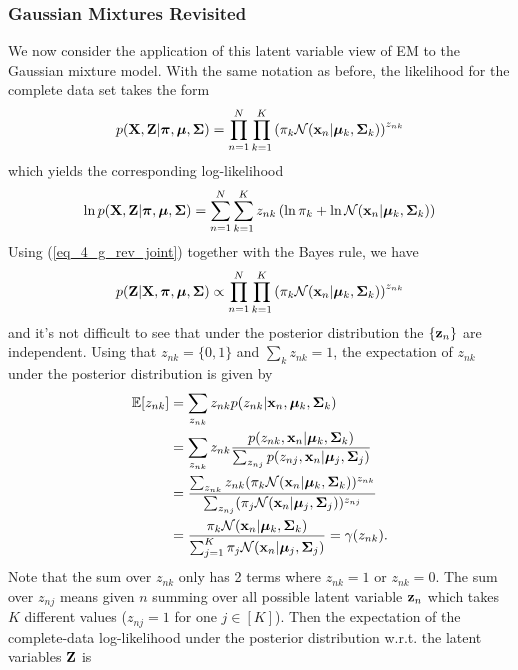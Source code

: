 \documentclass[../main.tex]{subfiles}
\begin{document}
\subsubsection{Gaussian Mixtures Revisited}
We now consider the application of this latent variable view of EM to the Gaussian mixture model. With the same notation as before, the likelihood for the complete data set takes the form
\begin{equation}\label{eq_4_g_rev_joint}
p({\bf X,Z}|\bm{\pi},\bm{\mu},{\bf \Sigma}) = \prod_{n=1}^{N}\prod_{k=1}^{K} \left(\pi_k \mathcal{N}({\bf x}_n|\bm{\mu}_k,{\bf \Sigma}_k)\right)^{z_{nk}}
\end{equation}
which yields the corresponding log-likelihood
\begin{equation*}
\ln p({\bf X,Z}|\bm{\pi},\bm{\mu},{\bf \Sigma}) = \sum_{n=1}^{N}\sum_{k=1}^{K} z_{nk}\left(\ln \pi_k +\ln \mathcal{N}({\bf x}_n|\bm{\mu}_k,{\bf \Sigma}_k)\right)
\end{equation*}
Using (\ref{eq_4_g_rev_joint}) together with the Bayes rule, we have
\begin{equation*}
p({\bf Z}|{\bf X}, \bm{\pi},\bm{\mu},{\bf \Sigma}) \propto  \prod_{n=1}^{N}\prod_{k=1}^{K} \left(\pi_k \mathcal{N}({\bf x}_n|\bm{\mu}_k,{\bf \Sigma}_k)\right)^{z_{nk}}
\end{equation*}
and it's not difficult to see that under the posterior distribution the $\{{\bf z}_n\}$ are independent. Using that $z_{nk}=\{0,1\}$ and $\sum_k z_{nk}=1$, the expectation of $z_{nk}$ under the posterior distribution is given by
\begin{align*}
\mathbb{E}[z_{nk}] &= \sum_{z_{nk}}z_{nk}p(z_{nk}|{\bf x}_n, \bm{\mu}_k, {\bf \Sigma}_k)\\
&= \sum_{z_{nk}}z_{nk} \frac{p(z_{nk},{\bf x}_n|\bm{\mu}_k, {\bf \Sigma}_k)}{\sum_{z_{nj}}p(z_{nj},{\bf x}_n|\bm{\mu}_j, {\bf \Sigma}_j)}\\
&= \frac{\sum_{z_{nk}}z_{nk}(\pi_k \mathcal{N}({\bf x}_n|\bm{\mu}_k,{\bf \Sigma}_k))^{z_{nk}}}{\sum_{z_{nj}}(\pi_j \mathcal{N}({\bf x}_n|\bm{\mu}_j,{\bf \Sigma}_j))^{z_{nj}}}\\
&= \frac{\pi_k \mathcal{N}({\bf x}_n|\bm{\mu}_k,{\bf \Sigma}_k)}{\sum_{j=1}^{K}\pi_j \mathcal{N}({\bf x}_n|\bm{\mu}_j,{\bf \Sigma}_j)} = \gamma(z_{nk}).
\end{align*}
Note that the sum over $z_{nk}$ only has 2 terms where $z_{nk}=1$ or $z_{nk}=0$. The sum over $z_{nj}$ means given $n$ summing over all possible latent variable ${\bf z}_n$ which takes $K$ different values ($z_{nj}=1$ for one $j \in [K] $). Then the expectation of the complete-data log-likelihood under the posterior distribution w.r.t. the latent variables ${\bf Z}$ is
\end{document}
